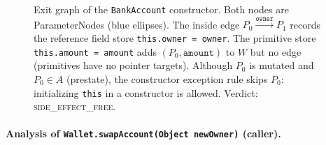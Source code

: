 \begin{figure}[h]
\centering
{}
\caption{Exit graph of the \texttt{BankAccount} constructor.
  Both nodes are ParameterNodes (blue ellipses).
  The inside edge $P_0 \xrightarrow{\texttt{owner}} P_1$ records the reference field store \texttt{this.owner = owner}.
  The primitive store \texttt{this.amount = amount} adds $(P_0, \texttt{amount})$ to $W$ but no edge (primitives have no pointer targets).
  Although $P_0$ is mutated and $P_0 \in A$ (prestate), the constructor exception rule skips $P_0$: initializing \texttt{this} in a constructor is allowed.
  Verdict: \textsc{side\_effect\_free}.}
\label{fig:ctor-exit}
\end{figure}


\paragraph{Analysis of \texttt{Wallet.swapAccount(Object newOwner)} (caller).}

